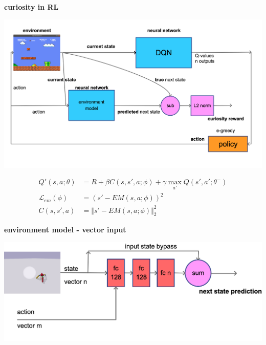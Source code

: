\documentclass[xcolor=dvipsnames]{beamer}
\begin{document}
\begin{frame}{\bf curiosity in RL}

  {\centering \includegraphics[scale=0.12]{../diagrams/dqncuriosity.png}}

  \begin{align*}
      Q'(s, a; \theta) &= R + \beta C(s, s', a; \phi) + \gamma \max \limits_{a'} Q(s', a'; \theta^-) \\
      \mathcal{L}_{em}(\phi) &= \left( s' - EM(s, a; \phi)  \right)^2 \\
      C(s, s', a) &= \Vert s' - EM(s, a; \phi) \Vert ^2_2
  \end{align*}

\end{frame}

\begin{frame}{\bf environment model - vector input}

  {\centering \includegraphics[scale=0.22]{../diagrams/fccuriositydetail.png}}

\end{frame}
\end{document}
